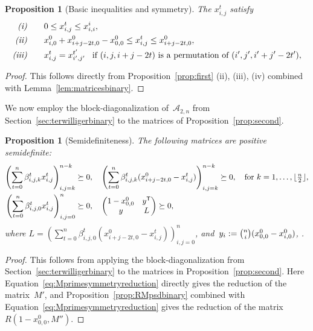 \documentclass[10pt,a4paper]{article}
\newtheorem{proposition}[theorem]{Proposition}
\theoremstyle{definition}
\newcommand{\T}{^{\mathsf{T}}}
\begin{document}
\begin{proposition}[Basic inequalities and symmetry]\label{prop:firstbinary}
    The $x_{i,j}^t$ satisfy 
\begin{align}\label{constraints:linearbinary}
\text{\emph{(i)}}& \quad\quad 0 \leq x_{i,j}^t \leq x_{i,i}^i, \\ 
\text{\emph{(ii)}}& \quad\quad x_{i,0}^0 + x^0_{i+j-2t,0}-x_{0,0}^0  \leq x_{i,j}^t\leq    x^0_{i+j-2t,0},\notag \\ 
\text{\emph{(iii)}}&\quad\quad  x_{i,j}^t = x_{i',j'}^{t'} \,\,\,\text{ if $(i,j,i+j-2t)$ is a permutation of $(i',j',i'+j'-2t')$},\notag
\end{align}
\end{proposition}
\begin{proof}
This follows directly from Proposition~\ref{prop:first} (ii), (iii), (iv) combined with Lemma~\ref{lem:matricesbinary}.
\end{proof} 

We now employ the block-diagonalization of~$\mathcal{A}_{2,n}$ from Section~\ref{sec:terwilligerbinary} to the matrices of Proposition~\ref{prop:second}.

\begin{proposition}[Semidefiniteness]\label{prop:secondbinary}
    The following matrices are positive semidefinite:
\begin{align}\label{eq:terwilligerbinarypsd}
\left(\sum_{t=0}^n \beta_{i,j,k}^t x_{i,j}^t  \right)_{i,j=k}^{n-k} \succeq 0, \quad &\left(\sum_{t=0}^n \beta_{i,j,k}^t (x^0_{i+j-2t,0}-x_{i,j}^t)  \right)_{i,j=k}^{n-k} \succeq 0, \quad \text{for $k=1,\ldots, \lfloor\tfrac{n}{2}\rfloor$},\\
\left(\sum_{t=0}^n \beta_{i,j,0}^t x_{i,j}^t  \right)_{i,j=0}^{n} \succeq 0,\quad &\begin{pmatrix} 1-x_{0,0}^0 & y\T \\ y & L \end{pmatrix} \succeq 0, \notag
\end{align}
where $L= \left(\sum_{t=0}^n \beta_{i,j,0}^t (x^0_{i+j-2t,0}-x_{i,j}^t)  \right)_{i,j=0}^{n}$, and~$y_i:=\tbinom{n}{i}(x_{0,0}^0-x_{i,0}^0)$, . 
\end{proposition}
\begin{proof} 
This follows from applying the block-diagonalization from Section~\ref{sec:terwilligerbinary} to the matrices in Proposition~\ref{prop:second}. Here Equation~\eqref{eq:Mprimesymmetryreduction} directly gives the reduction of the matrix~$M'$, and  Proposition~\ref{prop:RMpsdbinary} combined with Equation~\eqref{eq:Mprimesymmetryreduction} gives the reduction of the matrix $R(1-x_{0,0}^0,M'')$.
\end{proof} 
\end{document}
